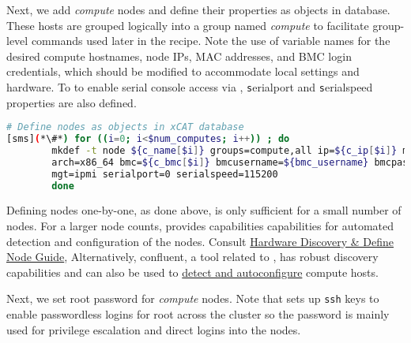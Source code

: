 
\noindent Next, we add {\em compute} nodes and define their properties as
objects in \xCAT{} database. 
These hosts are grouped logically into a group named {\em
compute} to facilitate group-level commands used later in the recipe.  Note the
use of variable names for the desired compute hostnames, node IPs, MAC
addresses, and BMC login credentials, which should be modified to accommodate
local settings and hardware. To to enable serial console access via  \xCAT{}, 
{\texttt serialport} and {\texttt serialspeed}
properties are also defined.

\begin{lstlisting}[language=bash,keywords={},upquote=true,basicstyle=\footnotesize\ttfamily,]
# Define nodes as objects in xCAT database
[sms](*\#*) for ((i=0; i<$num_computes; i++)) ; do
		mkdef -t node ${c_name[$i]} groups=compute,all ip=${c_ip[$i]} mac=${c_mac[$i]} netboot=xnba \
		arch=x86_64 bmc=${c_bmc[$i]} bmcusername=${bmc_username} bmcpassword=${bmc_password} \
		mgt=ipmi serialport=0 serialspeed=115200 
        done
\end{lstlisting}

\begin{center}
  \begin{tcolorbox}[]
    \small 
Defining nodes one-by-one, as done above, is only sufficient
for a small number of nodes. For a larger node counts,
\xCAT{} provides capabilities capabilities for automated detection and
configuration of the nodes.
Consult
\href{http://xcat-docs.readthedocs.io/en/stable/guides/admin-guides/manage_clusters/ppc64le/discovery/}{\color{blue}\xCAT{}
Hardware Discovery \& Define Node Guide}, Alternatively, confluent, a tool
related to \xCAT{}, has robust discovery capabilities and can also be used to
\href{https://hpc.lenovo.com/users/documentation/confluentdisco.html}{\color{blue}detect
and autoconfigure} compute hosts.  
\end{tcolorbox}
\end{center}


Next, we set root password for {\em compute} nodes. Note that \xCAT{} sets up 
\texttt{ssh} keys to enable passwordless logins for root across the cluster 
so the password is mainly used for privilege escalation and direct logins into
the nodes.

